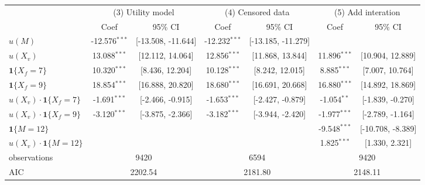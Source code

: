 \begin{tabular}{lcccccc}
  \hline
   & \multicolumn{2}{c}{(3) Utility model} & \multicolumn{2}{c}{(4) Censored data} & \multicolumn{2}{c}{(5) Add interation} \\ & Coef & 95\% CI & Coef & 95\% CI & Coef & 95\% CI \\ \hline
$u(M)$ & -12.576$^{***}$ & [-13.508, -11.644] & -12.232$^{***}$ & [-13.185, -11.279] &  &  \\ 
  $u(X_v)$ & 13.088$^{***}$ & [12.112, 14.064] & 12.856$^{***}$ & [11.868, 13.844] & 11.896$^{***}$ & [10.904, 12.889] \\ 
  $\textbf{1}\{X_f = 7\}$ & 10.320$^{***}$ & [8.436, 12.204] & 10.128$^{***}$ & [8.242, 12.015] & 8.885$^{***}$ & [7.007, 10.764] \\ 
  $\textbf{1}\{X_f = 9\}$ & 18.854$^{***}$ & [16.888, 20.820] & 18.680$^{***}$ & [16.691, 20.668] & 16.880$^{***}$ & [14.892, 18.869] \\ 
  $u(X_v)\cdot\textbf{1}\{X_f = 7\}$ & -1.691$^{***}$ & [-2.466, -0.915] & -1.653$^{***}$ & [-2.427, -0.879] & -1.054$^{**}$ & [-1.839, -0.270] \\ 
  $u(X_v)\cdot\textbf{1}\{X_f = 9\}$ & -3.120$^{***}$ & [-3.875, -2.366] & -3.182$^{***}$ & [-3.944, -2.420] & -1.977$^{***}$ & [-2.789, -1.164] \\ 
  $\textbf{1}\{M = 12\}$ &  &  &  &  & -9.548$^{***}$ & [-10.708, -8.389] \\ 
  $u(X_v)\cdot\textbf{1}\{M = 12\}$ &  &  &  &  & 1.825$^{***}$ & [1.330, 2.321] \\ 
   \hline observations & \multicolumn{2}{c}{9420} & \multicolumn{2}{c}{6594} & \multicolumn{2}{c}{9420} \\ AIC & \multicolumn{2}{c}{2202.54} & \multicolumn{2}{c}{2181.80} & \multicolumn{2}{c}{2148.11} \\ \hline
\end{tabular}

